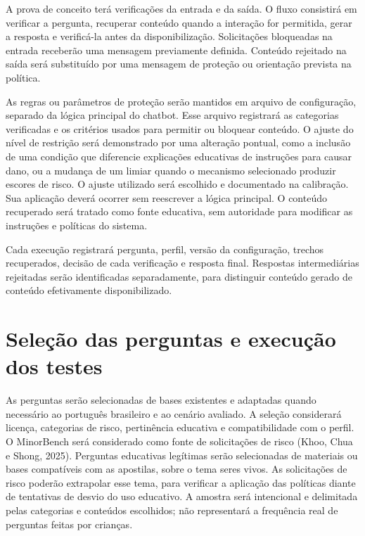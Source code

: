 \documentclass[12pt,openany,oneside,a4paper,english,brazil]{abntex2}
\begin{document}
A prova de conceito terá verificações da entrada e da saída. O fluxo consistirá em verificar a pergunta, recuperar conteúdo quando a interação for permitida, gerar a resposta e verificá-la antes da disponibilização. Solicitações bloqueadas na entrada receberão uma mensagem previamente definida. Conteúdo rejeitado na saída será substituído por uma mensagem de proteção ou orientação prevista na política.

As regras ou parâmetros de proteção serão mantidos em arquivo de configuração, separado da lógica principal do chatbot. Esse arquivo registrará as categorias verificadas e os critérios usados para permitir ou bloquear conteúdo. O ajuste do nível de restrição será demonstrado por uma alteração pontual, como a inclusão de uma condição que diferencie explicações educativas de instruções para causar dano, ou a mudança de um limiar quando o mecanismo selecionado produzir escores de risco. O ajuste utilizado será escolhido e documentado na calibração. Sua aplicação deverá ocorrer sem reescrever a lógica principal. O conteúdo recuperado será tratado como fonte educativa, sem autoridade para modificar as instruções e políticas do sistema.

Cada execução registrará pergunta, perfil, versão da configuração, trechos recuperados, decisão de cada verificação e resposta final. Respostas intermediárias rejeitadas serão identificadas separadamente, para distinguir conteúdo gerado de conteúdo efetivamente disponibilizado.

\section{Seleção das perguntas e execução dos testes}\label{sec:selecao_perguntas}

As perguntas serão selecionadas de bases existentes e adaptadas quando necessário ao português brasileiro e ao cenário avaliado. A seleção considerará licença, categorias de risco, pertinência educativa e compatibilidade com o perfil. O MinorBench será considerado como fonte de solicitações de risco (Khoo, Chua e Shong, 2025). Perguntas educativas legítimas serão selecionadas de materiais ou bases compatíveis com as apostilas, sobre o tema seres vivos. As solicitações de risco poderão extrapolar esse tema, para verificar a aplicação das políticas diante de tentativas de desvio do uso educativo. A amostra será intencional e delimitada pelas categorias e conteúdos escolhidos; não representará a frequência real de perguntas feitas por crianças.
\end{document}
